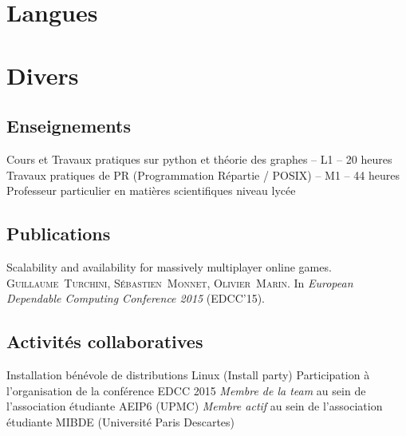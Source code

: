\documentclass[11pt,a4paper,sans]{moderncv}
\begin{document}
\section{Langues}
\vspace{1em}


\vspace{0.5em}


\section{Divers}
\vspace{0.3em}

\subsection{Enseignements}
\vspace{1em}

       {Cours et Travaux pratiques sur python et théorie des graphes -- L1 -- 20 heures}
       {Travaux pratiques de PR (Programmation Répartie / POSIX) -- M1 -- 44 heures}
       {Professeur particulier en matières scientifiques niveau lycée}

\vspace{0.5em}

\subsection{Publications}
\vspace{1em}

       {
            Scalability and availability for massively multiplayer online games.\endgraf
            \textsc{Guillaume~Turchini, Sébastien~Monnet, Olivier~Marin}.\endgraf
            In \textit{European Dependable Computing Conference 2015} (EDCC'15).
       }
       
\vspace{0.5em}

\subsection{Activités collaboratives}
\vspace{1em}

       {Installation bénévole de distributions Linux (Install party)}
       {Participation à l'organisation de la conférence EDCC 2015}
       {\textit{Membre de la team} au sein de l'association étudiante AEIP6 (UPMC)}
       {\textit{Membre actif} au sein de l'association étudiante MIBDE (Université Paris Descartes)}
\end{document}
